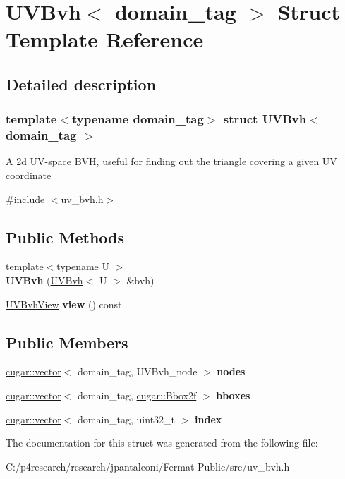 \hypertarget{struct_u_v_bvh}{}\section{U\+V\+Bvh$<$ domain\+\_\+tag $>$ Struct Template Reference}
\label{struct_u_v_bvh}


\subsection{Detailed description}
\subsubsection*{template$<$typename domain\+\_\+tag$>$\newline
struct U\+V\+Bvh$<$ domain\+\_\+tag $>$}

A 2d U\+V-\/space B\+VH, useful for finding out the triangle covering a given UV coordinate 

{\ttfamily \#include $<$uv\+\_\+bvh.\+h$>$}

\subsection*{Public Methods}
\begin{DoxyCompactItemize}
\item 
\mbox{\label{struct_u_v_bvh_af204817ef4303be53ae660613fca3b2b}} 
{\footnotesize template$<$typename U $>$ }\\{\bfseries U\+V\+Bvh} (\hyperlink{struct_u_v_bvh}{U\+V\+Bvh}$<$ U $>$ \&bvh)
\item 
\mbox{\label{struct_u_v_bvh_a44f4fbb4faaf0dcc6feb1750e4ca6622}} 
\hyperlink{struct_u_v_bvh_view}{U\+V\+Bvh\+View} {\bfseries view} () const
\end{DoxyCompactItemize}
\subsection*{Public Members}
\begin{DoxyCompactItemize}
\item 
\mbox{\label{struct_u_v_bvh_ab0d55693c49719dfd0ec7d5c22d730f5}} 
\hyperlink{structcugar_1_1vector}{cugar\+::vector}$<$ domain\+\_\+tag, U\+V\+Bvh\+\_\+node $>$ {\bfseries nodes}
\item 
\mbox{\label{struct_u_v_bvh_a6881e1a93de71bb3e4f4f5d3b02e4a51}} 
\hyperlink{structcugar_1_1vector}{cugar\+::vector}$<$ domain\+\_\+tag, \hyperlink{structcugar_1_1_bbox}{cugar\+::\+Bbox2f} $>$ {\bfseries bboxes}
\item 
\mbox{\label{struct_u_v_bvh_aef3602ff2cc50442edc880cd662968c7}} 
\hyperlink{structcugar_1_1vector}{cugar\+::vector}$<$ domain\+\_\+tag, uint32\+\_\+t $>$ {\bfseries index}
\end{DoxyCompactItemize}


The documentation for this struct was generated from the following file\+:\begin{DoxyCompactItemize}
\item 
C\+:/p4research/research/jpantaleoni/\+Fermat-\/\+Public/src/uv\+\_\+bvh.\+h\end{DoxyCompactItemize}
